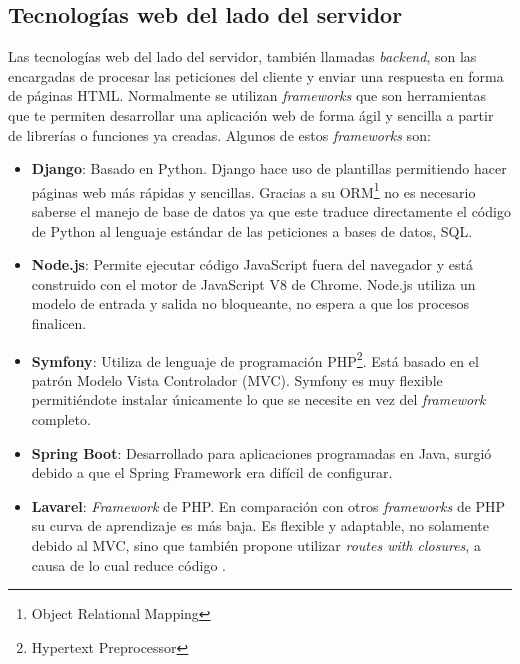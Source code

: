 \subsection{Tecnologías web del lado del servidor}
Las tecnologías web del lado del servidor, también llamadas \textit{backend}, son las encargadas de procesar las peticiones del cliente y enviar una respuesta en forma de páginas HTML. Normalmente se utilizan \textit{frameworks }que son herramientas que te permiten desarrollar una aplicación web de forma ágil y sencilla a partir de librerías o funciones ya creadas. Algunos de estos \textit{frameworks} son:

\begin{itemize}
\item \textbf{Django}: Basado en Python. Django hace uso de plantillas permitiendo hacer páginas web más rápidas y sencillas. Gracias a su ORM\footnote{Object Relational Mapping} no es necesario saberse el manejo de base de datos ya que este traduce directamente el código de Python al lenguaje estándar de las peticiones a bases de datos, SQL.
\item \textbf{Node.js}: Permite ejecutar código JavaScript fuera del navegador y está construido con el motor de JavaScript V8 de Chrome. Node.js utiliza un modelo de entrada y salida no bloqueante, no espera a que los procesos finalicen.
\item \textbf{Symfony}: Utiliza de lenguaje de programación PHP\footnote{Hypertext Preprocessor}. Está basado en el patrón Modelo Vista Controlador (MVC). Symfony es muy flexible permitiéndote instalar únicamente lo que se necesite en vez del \textit{framework} completo.
  \item \textbf{Spring Boot}: Desarrollado para aplicaciones programadas en Java, surgió debido a que el Spring Framework era difícil de configurar. 
\item \textbf{Lavarel}: \textit{Framework} de PHP. En comparación con otros \textit{frameworks } de PHP su curva de aprendizaje es más baja. Es flexible y adaptable, no solamente debido al MVC, sino que también propone utilizar \textit{routes with closures}, a causa de lo cual reduce código \cite{lavarel}.
\end{itemize}


